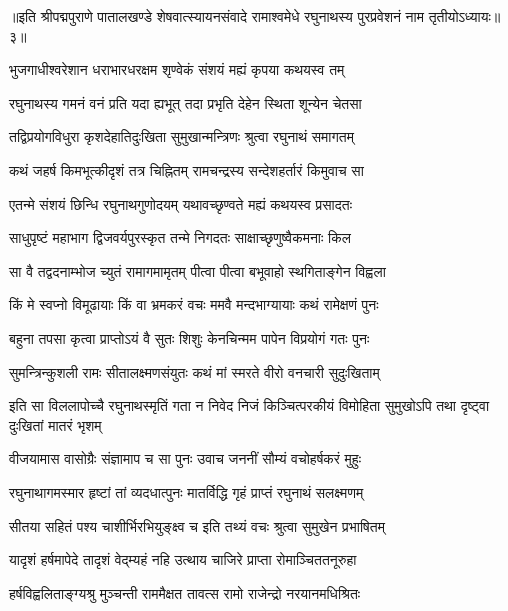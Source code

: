 {॥इति श्रीपद्मपुराणे पातालखण्डे शेषवात्स्यायनसंवादे रामाश्वमेधे रघुनाथस्य पुरप्रवेशनं नाम तृतीयोऽध्यायः॥३॥}



\twolineshloka
{भुजगाधीश्वरेशान धराभारधरक्षम}
{शृण्वेकं संशयं मह्यं कृपया कथयस्व तम्}%

\twolineshloka
{रघुनाथस्य गमनं वनं प्रति यदा ह्यभूत्}
{तदा प्रभृति देहेन स्थिता शून्येन चेतसा}%

\twolineshloka
{तद्विप्रयोगविधुरा कृशदेहातिदुःखिता}
{सुमुखान्मन्त्रिणः श्रुत्वा रघुनाथं समागतम्}%

\twolineshloka
{कथं जहर्ष किमभूत्कीदृशं तत्र चिह्नितम्}
{रामचन्द्रस्य सन्देशहर्तारं किमुवाच सा}%

\twolineshloka
{एतन्मे संशयं छिन्धि रघुनाथगुणोदयम्}
{यथावच्छृण्वते मह्यं कथयस्व प्रसादतः}%


\twolineshloka
{साधुपृष्टं महाभाग द्विजवर्यपुरस्कृत}
{तन्मे निगदतः साक्षाच्छृणुष्वैकमनाः किल}%

\twolineshloka
{सा वै तद्वदनाम्भोज च्युतं रामागमामृतम्}
{पीत्वा पीत्वा बभूवाहो स्थगिताङ्गेन विह्वला}%

\twolineshloka
{किं मे स्वप्नो विमूढायाः किं वा भ्रमकरं वचः}
{ममवै मन्दभाग्यायाः कथं रामेक्षणं पुनः}%

\twolineshloka
{बहुना तपसा कृत्वा प्राप्तोऽयं वै सुतः शिशुः}
{केनचिन्मम पापेन विप्रयोगं गतः पुनः}%

\twolineshloka
{सुमन्त्रिन्कुशली रामः सीतालक्ष्मणसंयुतः}
{कथं मां स्मरते वीरो वनचारी सुदुःखिताम्}%


\threelineshloka
{इति सा विललापोच्चै रघुनाथस्मृतिं गता}
{न निवेद निजं किञ्चित्परकीयं विमोहिता}
{सुमुखोऽपि तथा दृष्ट्वा दुःखितां मातरं भृशम्}%

\twolineshloka
{वीजयामास वासोग्रैः संज्ञामाप च सा पुनः}
{उवाच जननीं सौम्यं वचोहर्षकरं मुहुः}%

\twolineshloka
{रघुनाथागमस्मार हृष्टां तां व्यदधात्पुनः}
{मातर्विद्धि गृहं प्राप्तं रघुनाथं सलक्ष्मणम्}%

\twolineshloka
{सीतया सहितं पश्य चाशीर्भिरभियुङ्क्ष्व च}
{इति तथ्यं वचः श्रुत्वा सुमुखेन प्रभाषितम्}%

\twolineshloka
{यादृशं हर्षमापेदे तादृशं वेद्म्यहं नहि}
{उत्थाय चाजिरे प्राप्ता रोमाञ्चिततनूरुहा}%

\twolineshloka
{हर्षविह्वलिताङ्ग्यश्रु मुञ्चन्ती राममैक्षत}
{तावत्स रामो राजेन्द्रो नरयानमधिश्रितः}%


